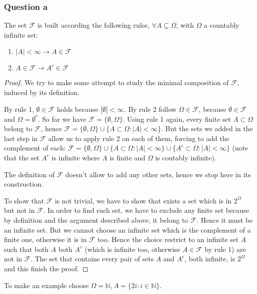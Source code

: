 \documentclass[twoside,openright,titlepage,fleqn,
	headinclude,11pt,a4paper,BCOR5mm,footinclude
	]{scrbook}
\begin{document}
\subsubsection{Question a}
The set $\mathcal{F}$ is built according the following rules, $\forall
A \subseteq \Omega$, with $\Omega$ a countably infinite set:
\begin{enumerate}
\item $|A| < \infty \rightarrow A \in \mathcal{F}$
\item $A \in \mathcal{F} \rightarrow A^c \in \mathcal{F}$
\end{enumerate}
\begin{proof}
  We try to make some attempt to study the minimal composition of
  $\mathcal{F}$, induced by its definition.

  By rule 1, $\emptyset \in \mathcal{F}$ holds because $|\emptyset| <
  \infty$. By rule 2 follow $\Omega \in \mathcal{F}$, because
  $\emptyset \in \mathcal{F}$ and $\Omega = \emptyset^c$. So far we
  have $\mathcal{F} = \{\emptyset, \Omega \}$. Using rule 1 again,
  every finite set $A \subset \Omega$ belong to $\mathcal{F}$, hence
  $\mathcal{F} = \{\emptyset, \Omega \} \cup \{A \subset \Omega:
  |A|<\infty\}$. But the sets we added in the last step in
  $\mathcal{F}$ allow us to apply rule 2 on each of them, forcing to
  add the complement of each: $\mathcal{F} = \{\emptyset, \Omega \}
  \cup \{A \subset \Omega: |A|<\infty\} \cup \{A^c \subset \Omega:
  |A|<\infty\}$ (note that the set $A^c$ is infinite where $A$ is
  finite and $\Omega$ is coutably infinite).

  The definition of $\mathcal{F}$ doesn't allow to add any other sets,
  hence we stop here in its construction.

  To show that $\mathcal{F}$ is not trivial, we have to show that
  exists a set which is in $2^{\Omega}$ but not in $\mathcal{F}$. In
  order to find such set, we have to exclude any finite set because by
  definition and the argument described above, it belong to
  $\mathcal{F}$. Hence it must be an infinite set. But we cannot
  choose an infinite set which is the complement of a finite one,
  otherwise it is in $\mathcal{F}$ too. Hence the choice restrict to
  an infinite set $A$ such that both $A$ both $A^c$ (which is infinite
  too, otherwise $A \in \mathcal{F}$ by rule 1) are not in
  $\mathcal{F}$. The set that contains every pair of sets $A$ and
  $A^c$, both infinite, is $2^\Omega$ and this finish the proof.
\end{proof}
To make an example choose $\Omega = \mathbb{N}, A = \{2i:i \in
\mathbb{N}\}$.
\end{document}
